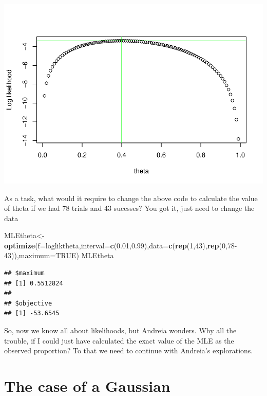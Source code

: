 \documentclass[
]{book}
\newenvironment{Shaded}{\begin{snugshade}}{\end{snugshade}}
\newcommand{\DataTypeTok}[1]{\textcolor[rgb]{0.13,0.29,0.53}{#1}}
\newcommand{\DecValTok}[1]{\textcolor[rgb]{0.00,0.00,0.81}{#1}}
\newcommand{\FloatTok}[1]{\textcolor[rgb]{0.00,0.00,0.81}{#1}}
\newcommand{\KeywordTok}[1]{\textcolor[rgb]{0.13,0.29,0.53}{\textbf{#1}}}
\newcommand{\NormalTok}[1]{#1}
\newcommand{\OtherTok}[1]{\textcolor[rgb]{0.56,0.35,0.01}{#1}}
\begin{document}
\includegraphics{ECOMODbook_files/figure-latex/ch13.16-1.pdf}

As a task, what would it require to change the above code to calculate the value of theta if we had 78 trials and 43 sucesses? You got it, just need to change the data

\begin{Shaded}
\begin{Highlighting}[]
\NormalTok{MLEtheta<-}\KeywordTok{optimize}\NormalTok{(}\DataTypeTok{f=}\NormalTok{logliktheta,}\DataTypeTok{interval=}\KeywordTok{c}\NormalTok{(}\FloatTok{0.01}\NormalTok{,}\FloatTok{0.99}\NormalTok{),}\DataTypeTok{data=}\KeywordTok{c}\NormalTok{(}\KeywordTok{rep}\NormalTok{(}\DecValTok{1}\NormalTok{,}\DecValTok{43}\NormalTok{),}\KeywordTok{rep}\NormalTok{(}\DecValTok{0}\NormalTok{,}\DecValTok{78-43}\NormalTok{)),}\DataTypeTok{maximum=}\OtherTok{TRUE}\NormalTok{)}
\NormalTok{MLEtheta}
\end{Highlighting}
\end{Shaded}

\begin{verbatim}
## $maximum
## [1] 0.5512824
## 
## $objective
## [1] -53.6545
\end{verbatim}

So, now we know all about likelihoods, but Andreia wonders. Why all the trouble, if I could just have calculated the exact value of the MLE as the observed proportion? To that we need to continue with Andreia's explorations.

\hypertarget{the-case-of-a-gaussian}{%
\section{The case of a Gaussian}\label{the-case-of-a-gaussian}}
\end{document}
